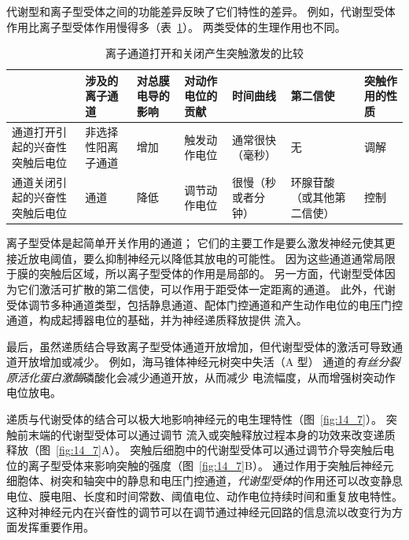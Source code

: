 代谢型和离子型受体之间的功能差异反映了它们特性的差异。
例如，代谢型受体作用比离子型受体作用慢得多（表~\ref{tab:14_1}）。
两类受体的生理作用也不同。


\begin{table}[htbp]
	\caption{离子通道打开和关闭产生突触激发的比较} \label{tab:14_1} \centering
	\begin{tabular}{lllllll}
		\toprule
		 & 涉及的离子通道 & 对总膜电导的影响 & 对动作电位的贡献 & 时间曲线 & 第二信使 & 突触作用的性质 \\
		\midrule
		通道打开引起的兴奋性突触后电位 & 非选择性阳离子通道 & 增加 & 触发动作电位 & 通常很快（毫秒） & 无 & 调解\\
		\midrule
		通道关闭引起的兴奋性突触后电位 & \ce{K+} 通道 & 降低 & 调节动作电位 & 很慢（秒或者分钟） & 环腺苷酸（或其他第二信使） & 控制 \\
		\bottomrule
	\end{tabular}
\end{table}


离子型受体是起简单开关作用的通道；
它们的主要工作是要么激发神经元使其更接近放电阈值，要么抑制神经元以降低其放电的可能性。
因为这些通道通常局限于膜的突触后区域，所以离子型受体的作用是局部的。
另一方面，代谢型受体因为它们激活可扩散的第二信使，可以作用于距受体一定距离的通道。
此外，代谢受体调节多种通道类型，包括静息通道、配体门控通道和产生动作电位的电压门控通道，构成起搏器电位的基础，并为神经递质释放提供  流入。


最后，虽然递质结合导致离子型受体通道开放增加，但代谢型受体的激活可导致通道开放增加或减少。
例如，海马锥体神经元树突中失活（A 型） 通道的\textit{有丝分裂原活化蛋白激酶}磷酸化会减少通道开放，从而减少  电流幅度，从而增强树突动作电位放电。


递质与代谢受体的结合可以极大地影响神经元的电生理特性（图~\ref{fig:14_7}）。
突触前末端的代谢型受体可以通过调节  流入或突触释放过程本身的功效来改变递质释放（图~\ref{fig:14_7}A）。
突触后细胞中的代谢型受体可以通过调节介导突触后电位的离子型受体来影响突触的强度（图~\ref{fig:14_7}B）。
通过作用于突触后神经元细胞体、树突和轴突中的静息和电压门控通道，\textit{代谢型受体}的作用还可以改变静息电位、膜电阻、长度和时间常数、阈值电位、动作电位持续时间和重复放电特性。
这种对神经元内在兴奋性的调节可以在调节通过神经元回路的信息流以改变行为方面发挥重要作用。


